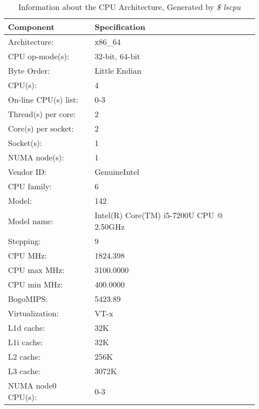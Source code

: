 \documentclass[usletter, 12pt]{article}
\begin{document}
        \begin{table}[h]
            \caption{Information about the CPU Architecture, Generated by \textit{\$ lscpu}}
            \centering
            \begin{tabular*}{300pt}{@{\extracolsep{\fill}} p{5cm} p{5cm}}

            \textbf{Component} & \textbf{Specification} \\
            \hline
            Architecture:          & x86\_64 \\
            CPU op-mode(s):        & 32-bit, 64-bit \\
            Byte Order:            & Little Endian \\
            CPU(s):                & 4 \\
            On-line CPU(s) list:   & 0-3 \\
            Thread(s) per core:    & 2 \\
            Core(s) per socket:    & 2 \\
            Socket(s):             & 1 \\
            NUMA node(s):          & 1 \\
            Vendor ID:             & GenuineIntel \\
            CPU family:            & 6 \\
            Model:                 & 142 \\
            Model name:            & Intel(R) Core(TM) i5-7200U CPU @ 2.50GHz \\
            Stepping:              & 9 \\
            CPU MHz:               & 1824.398 \\
            CPU max MHz:           & 3100.0000 \\
            CPU min MHz:           & 400.0000 \\
            BogoMIPS:              & 5423.89 \\
            Virtualization:        & VT-x \\
            L1d cache:             & 32K \\
            L1i cache:             & 32K \\
            L2 cache:              & 256K \\
            L3 cache:              & 3072K \\
            NUMA node0 CPU(s):     & 0-3 \\
            \end{tabular*}
        \end{table}
\end{document}
